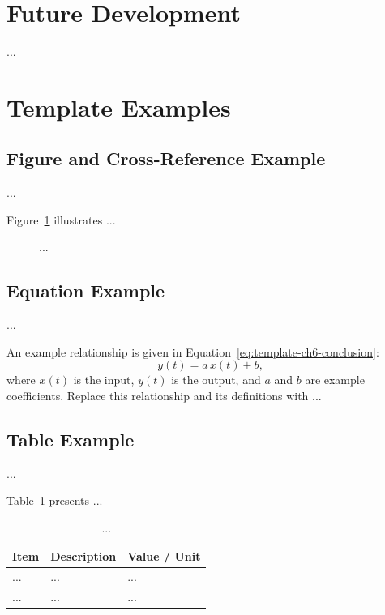 \section{Future Development}
...

\section{Template Examples}
\label{sec:template-ch6-conclusion}

\subsection{Figure and Cross-Reference Example}
...

Figure~\ref{fig:template-ch6-conclusion} illustrates ...
\begin{figure}[htbp]
    \centering
    \caption{...}
    \label{fig:template-ch6-conclusion}
\end{figure}

\subsection{Equation Example}
...

An example relationship is given in Equation~\eqref{eq:template-ch6-conclusion}:
\begin{equation}
    y(t) = a\,x(t) + b,
    \label{eq:template-ch6-conclusion}
\end{equation}
where $x(t)$ is the input, $y(t)$ is the output, and $a$ and $b$ are
example coefficients. Replace this relationship and its definitions with ...

\subsection{Table Example}
...

Table~\ref{tab:template-ch6-conclusion} presents ...
\begin{table}[htbp]
    \centering
    \caption{...}
    \label{tab:template-ch6-conclusion}
    \begin{tabularx}{0.9\linewidth}{lXX}
        \toprule
        \textbf{Item} & \textbf{Description} & \textbf{Value / Unit} \\
        \midrule
        ... & ... & ... \\
        ... & ... & ... \\
        \bottomrule
    \end{tabularx}
\end{table}
